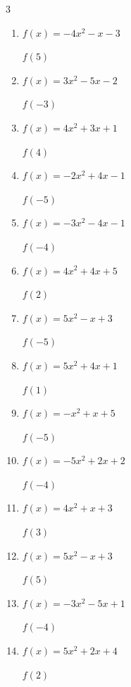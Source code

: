 \begin{multicols}{3}
\begin{enumerate}
$f(-5)$
        \phantom{$= 46$}

  \item $f(x)=-4x^{2}-x-3$

$f(5)$
        \phantom{$= -108$}

  \item $f(x)=3x^{2}-5x-2$

$f(-3)$
        \phantom{$= 40$}

  \item $f(x)=4x^{2}+3x+1$

$f(4)$
        \phantom{$= 77$}

  \item $f(x)=-2x^{2}+4x-1$

$f(-5)$
        \phantom{$= -71$}

  \item $f(x)=-3x^{2}-4x-1$

$f(-4)$
        \phantom{$= -33$}

  \item $f(x)=4x^{2}+4x+5$

$f(2)$
        \phantom{$= 29$}

  \item $f(x)=5x^{2}-x+3$

$f(-5)$
        \phantom{$= 133$}

  \item $f(x)=5x^{2}+4x+1$

$f(1)$
        \phantom{$= 10$}

  \item $f(x)=-x^{2}+x+5$

$f(-5)$
        \phantom{$= -25$}

  \item $f(x)=-5x^{2}+2x+2$

$f(-4)$
        \phantom{$= -86$}

  \item $f(x)=4x^{2}+x+3$

$f(3)$
        \phantom{$= 42$}

  \item $f(x)=5x^{2}-x+3$

$f(5)$
        \phantom{$= 123$}

  \item $f(x)=-3x^{2}-5x+1$

$f(-4)$
        \phantom{$= -27$}

  \item $f(x)=5x^{2}+2x+4$

$f(2)$
        \phantom{$= 28$}


\end{enumerate}
\end{multicols}
